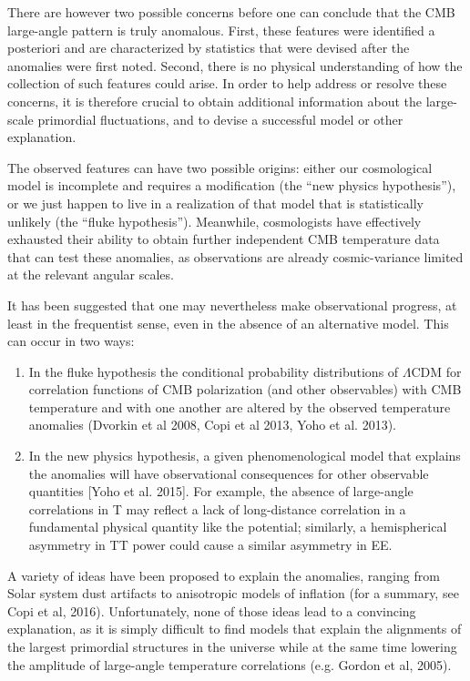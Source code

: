 There are however two possible concerns before one can conclude that the CMB large-angle pattern is truly anomalous. First, these features were identified a posteriori and are characterized by statistics that were devised after the anomalies were first noted. Second, there is no physical understanding of how the collection of such features could arise. In order to help address or resolve these concerns, it is therefore crucial to obtain additional information about the large-scale primordial fluctuations, and to devise a successful model or other explanation.

The observed features can have two possible origins: either our cosmological model is incomplete and requires a modification (the “new physics hypothesis”), or we just happen to live in a realization of that model that is statistically unlikely (the “fluke hypothesis”).   Meanwhile, cosmologists have effectively exhausted their ability to obtain further independent CMB temperature data that can test these anomalies, as observations are already cosmic-variance limited at the relevant angular scales.

It has been suggested that one may nevertheless make observational progress, at least in the frequentist sense, even in the absence of an alternative model.  This can occur in two ways:
\begin{enumerate}
  \item In the fluke hypothesis the conditional probability distributions of $\Lambda$CDM for correlation functions of CMB polarization
  (and other observables) with CMB temperature and with one another are altered by the observed temperature anomalies  
  (Dvorkin et al 2008, Copi et al 2013, Yoho et al. 2013). 
  \item In the new physics hypothesis, a given phenomenological model that explains the anomalies will have observational consequences
  for other observable quantities [Yoho et al. 2015]. For example, the absence of large-angle correlations in T may reflect a lack of
  long-distance correlation in a fundamental physical quantity like the potential; similarly, 
  a hemispherical asymmetry in TT power could cause a similar asymmetry in EE.
\end{enumerate}

A variety of ideas have been proposed to explain the anomalies, ranging from Solar system dust artifacts to anisotropic models of inflation (for a summary, see Copi et al, 2016). Unfortunately, none of those ideas lead to a convincing explanation, as it is simply difficult to find models that explain the alignments of the largest primordial structures in the universe while at the same time lowering the amplitude of large-angle temperature correlations (e.g. Gordon et al, 2005). 

